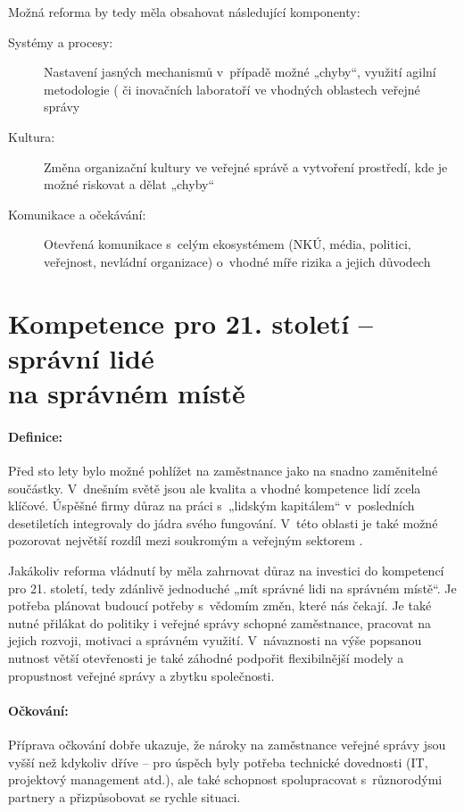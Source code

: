 Možná reforma by tedy měla obsahovat následující komponenty:

\begin{description}
  \item[Systémy a procesy:] Nastavení jasných mechanismů v~případě možné „chyby“, využití agilní metodologie (\cite{christopher_blueprint_2021} či inovačních laboratoří ve vhodných oblastech veřejné správy \cite{cr2030_kvalita_udrzitelnost}
  \item[Kultura:] Změna organizační kultury ve veřejné správě a vytvoření prostředí, kde je možné riskovat a dělat „chyby“
  \item[Komunikace a očekávání:] Otevřená komunikace s~celým ekosystémem (NKÚ, média, politici, veřejnost, nevládní organizace) o~vhodné míře rizika a jejich důvodech
\end{description}

\section*{Kompetence pro 21. století -- správní lidé \\ na správném místě}

\paragraph{Definice:} Před sto lety bylo možné pohlížet na zaměstnance jako na snadno za\-mě\-ni\-tel\-né součástky. V~dnešním světě jsou ale kvalita a vhodné kompetence lidí zcela klíčové. Úspěšné firmy důraz na práci s~„lidským kapitálem“ v~posledních desetiletích integrovaly do jádra svého fungování. V~této oblasti je také možné pozorovat největší rozdíl mezi soukromým a veřejným sektorem \cite{d_eggers_future_2020}.

Jakákoliv reforma vládnutí by měla zahrnovat důraz na investici do kompetencí pro 21. století, tedy zdánlivě jednoduché „mít správné lidi na správném místě“. Je potřeba plánovat budoucí potřeby s~vědomím změn, které nás čekají. Je také nutné přilákat do politiky i veřejné správy schopné zaměstnance, pracovat na jejich rozvoji, motivaci a správném využití. V~návaznosti na výše popsanou nutnost větší otevřenosti je také záhodné podpořit flexibilnější modely a propustnost veřejné správy a zbytku společnosti.

\paragraph{Očkování:} Příprava očkování dobře ukazuje, že nároky na zaměstnance veřejné správy jsou vyšší než kdykoliv dříve -- pro úspěch byly potřeba technické dovednosti (IT, projektový management atd.), ale také schopnost spolupracovat s~různorodými partnery a přizpůsobovat se rychle situaci. 

